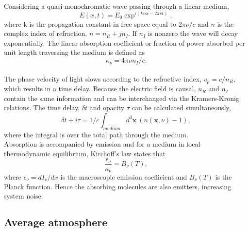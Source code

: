 Considering a quasi-monochromatic wave passing through a linear medium,
\begin{equation}
E(x,t) = E_0 \exp^{i(knx - 2\pi\nu t)},
\end{equation}		
where k is the propagation constant in free space equal to $2\pi \nu/c$ and $n$ is the complex index of refraction, $n= n_R + j n_I$. If $n_I$ is nonzero the wave will decay exponentially. The linear absorption coefficient or fraction of power absorbed per unit length traversing the medium is defined as 
\begin{equation}
\kappa_\nu = 4\pi \nu n_I/c.
\end{equation}
~\\
The phase velocity of light slows according to the refractive index, $v_p = c/n_R$, which results in a time delay.  Because the electric field is causal, $n_R$ and $n_I$ contain the same information and can be interchanged via the Kramers-Kronig relations. The time delay, $\delta t$ and opacity $\tau$ can be calculated simultaneously,
\begin{equation}\label{timedelay}
\delta t + i \tau =1/c \int_{medium} d^3\mathbf{x}\  (n(\mathbf{x}, \nu) -1),
\end{equation}
where the integral is over the total path through the medium.
~\\
Absorption is accompanied by emission and for a medium in local thermodynamic equilibrium, Kirchoff's law states that 
\begin{equation}\label{kirchoff}
\frac{\epsilon_\nu}{\kappa_\nu}=B_\nu(T),
\end{equation}
where $\epsilon_\nu = dI_\nu/dx$ is the macroscopic emission coefficient and $B_\nu(T)$ is the Planck function. Hence the absorbing molecules are also emitters, increasing system noise.\\


\subsection{Average atmosphere}


